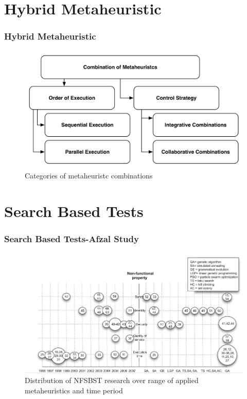 \documentclass{beamer}
\begin{document}
\section{Hybrid Metaheuristic}

\begin{frame}
\frametitle{Hybrid Metaheuristic}
\begin{figure}[H]
\centering
\includegraphics[width=1\linewidth]{metaheuristc2.png}
\caption{Categories of metaheuristc combinations}
\end{figure}
\end{frame}


\section{Search Based Tests}

\begin{frame}
\frametitle{Search Based Tests-Afzal Study}
\begin{figure}[H]
\centering
\includegraphics[width=1\linewidth]{afzal.png}
\caption{Distribution of NFSBST research over range of applied metaheuristics and time period  \cite{Afzal2009}}
\end{figure}
\end{frame}
\end{document}
